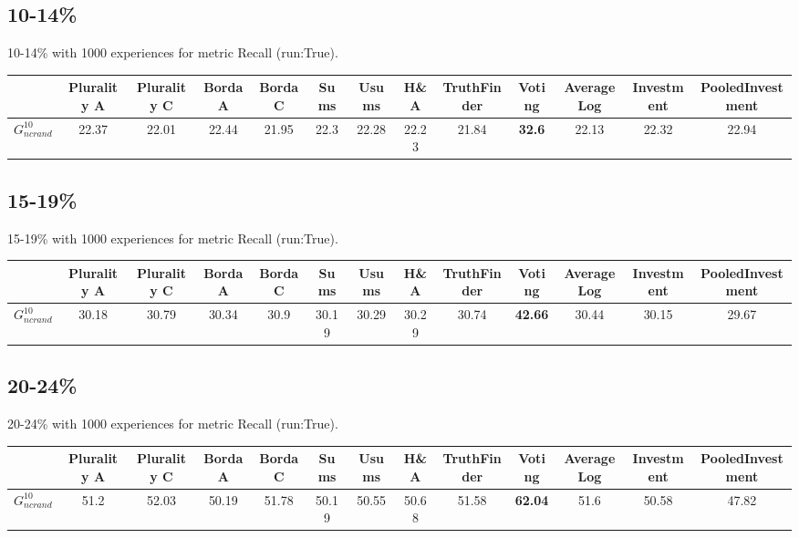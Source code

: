 \documentclass{article}
\newcommand{\graph}[2]{$G_{#1}^{#2}$}
\begin{document}
\newpage

\subsection{10-14\%}

10-14\% with 1000 experiences for metric Recall (run:True).

\noindent\begin{tabular}{|l|c|c|c|c|c|c|c|c|c|c|c|c|}
\hline
& Plurality A& Plurality C& Borda A& Borda C& Sums& Usums& H\&A& TruthFinder& Voting& AverageLog& Investment& PooledInvestment\\
\hline
\graph{ncrand}{10} &22.37&22.01&22.44&21.95&22.3&22.28&22.23&21.84&\textbf{32.6}&22.13&22.32&22.94\\
\hline
\end{tabular}
\newpage

\subsection{15-19\%}

15-19\% with 1000 experiences for metric Recall (run:True).

\noindent\begin{tabular}{|l|c|c|c|c|c|c|c|c|c|c|c|c|}
\hline
& Plurality A& Plurality C& Borda A& Borda C& Sums& Usums& H\&A& TruthFinder& Voting& AverageLog& Investment& PooledInvestment\\
\hline
\graph{ncrand}{10} &30.18&30.79&30.34&30.9&30.19&30.29&30.29&30.74&\textbf{42.66}&30.44&30.15&29.67\\
\hline
\end{tabular}
\newpage

\subsection{20-24\%}

20-24\% with 1000 experiences for metric Recall (run:True).

\noindent\begin{tabular}{|l|c|c|c|c|c|c|c|c|c|c|c|c|}
\hline
& Plurality A& Plurality C& Borda A& Borda C& Sums& Usums& H\&A& TruthFinder& Voting& AverageLog& Investment& PooledInvestment\\
\hline
\graph{ncrand}{10} &51.2&52.03&50.19&51.78&50.19&50.55&50.68&51.58&\textbf{62.04}&51.6&50.58&47.82\\
\hline
\end{tabular}
\newpage
\end{document}

